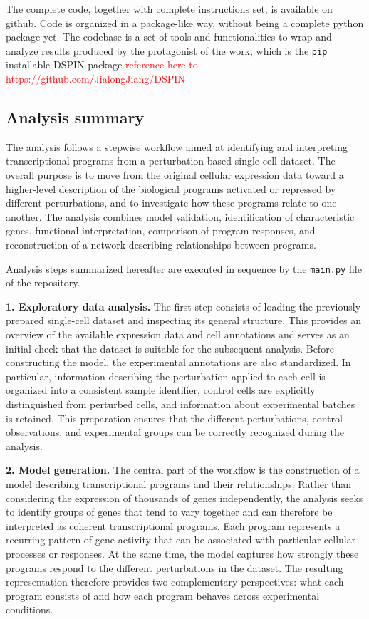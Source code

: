 \documentclass[11pt,a4paper]{article}
\begin{document}
The complete code, together with complete instructions set, is available on \href{https://github.com/demetriomagatti/d_spin_oda_thesis/tree/master}{github}. Code is organized in a package-like way, without being a complete python package yet. The codebase is a set of tools and functionalities to wrap and analyze results produced by the protagonist of the work, which is the \texttt{pip} installable DSPIN package \textcolor{red}{reference here to https://github.com/JialongJiang/DSPIN}

\subsection{Analysis summary}

The analysis follows a stepwise workflow aimed at identifying and interpreting transcriptional programs from a perturbation-based single-cell dataset. The overall purpose is to move from the original cellular expression data toward a higher-level description of the biological programs activated or repressed by different perturbations, and to investigate how these programs relate to one another. The analysis combines model validation, identification of characteristic genes, functional interpretation, comparison of program responses, and reconstruction of a network describing relationships between programs. 

Analysis steps summarized hereafter are executed in sequence by the \texttt{main.py} file of the repository. 

\textbf{1. Exploratory data analysis.} The first step consists of loading the previously prepared single-cell dataset and inspecting its general structure. This provides an overview of the available expression data and cell annotations and serves as an initial check that the dataset is suitable for the subsequent analysis. Before constructing the model, the experimental annotations are also standardized. In particular, information describing the perturbation applied to each cell is organized into a consistent sample identifier, control cells are explicitly distinguished from perturbed cells, and information about experimental batches is retained. This preparation ensures that the different perturbations, control observations, and experimental groups can be correctly recognized during the analysis.

\textbf{2. Model generation.} The central part of the workflow is the construction of a model describing transcriptional programs and their relationships. Rather than considering the expression of thousands of genes independently, the analysis seeks to identify groups of genes that tend to vary together and can therefore be interpreted as coherent transcriptional programs. Each program represents a recurring pattern of gene activity that can be associated with particular cellular processes or responses. At the same time, the model captures how strongly these programs respond to the different perturbations in the dataset. The resulting representation therefore provides two complementary perspectives: what each program consists of and how each program behaves across experimental conditions.
\end{document}
